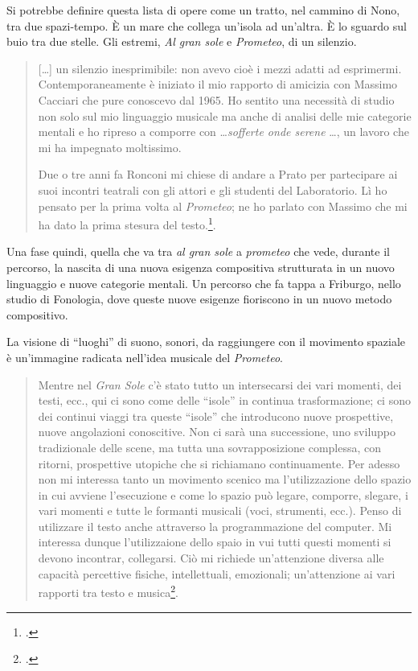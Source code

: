 Si potrebbe definire questa lista di opere come un tratto, nel cammino di Nono, tra due spazi-tempo. È un mare che collega un'isola ad un'altra. È lo sguardo sul buio tra due stelle. Gli estremi, \emph{Al gran sole} e \emph{Prometeo}, di un silenzio.

\begin{quote}
[\ldots] un silenzio inesprimibile: non avevo cioè i mezzi adatti ad esprimermi. Contemporaneamente è iniziato il mio rapporto di amicizia con Massimo Cacciari che pure conoscevo dal 1965. Ho sentito una necessità di studio non solo sul mio linguaggio musicale ma anche di analisi delle mie categorie mentali e ho ripreso a comporre con \ldots \emph{sofferte onde serene} \ldots, un lavoro che mi ha impegnato moltissimo.

	Due o tre anni fa Ronconi mi chiese di andare a Prato per partecipare ai suoi incontri teatrali con gli attori e gli studenti del Laboratorio. Lì ho pensato per la prima volta al \emph{Prometeo}; ne ho parlato con Massimo che mi ha dato la prima stesura del testo.\footcite[vol. II p. 245, \emph{Intervista di Renato Garavaglia 1979-80}]{nono:scrcol}.
\end{quote}

Una fase quindi, quella che va tra \emph{al gran sole} a \emph{prometeo} che vede, durante il percorso, la nascita di una nuova esigenza compositiva strutturata in un nuovo linguaggio e nuove categorie mentali. Un percorso che fa tappa a Friburgo, nello studio di Fonologia, dove queste nuove esigenze fioriscono in un nuovo metodo compositivo.

La visione di “luoghi” di suono, sonori, da raggiungere con il movimento spaziale è un'immagine radicata nell'idea musicale del \emph{Prometeo}.

\begin{quote}
	Mentre nel \emph{Gran Sole} c'è stato tutto un intersecarsi dei vari momenti, dei testi, ecc., qui ci sono come delle “isole” in continua trasformazione; ci sono dei continui viaggi tra queste “isole” che introducono nuove prospettive, nuove angolazioni conoscitive. Non ci sarà una successione, uno sviluppo tradizionale delle scene, ma tutta una sovrapposizione complessa, con ritorni, prospettive utopiche che si richiamano continuamente. Per adesso non mi interessa tanto un movimento scenico ma l'utilizzazione dello spazio in cui avviene l'esecuzione e come lo spazio può legare, comporre, slegare, i vari momenti e tutte le formanti musicali (voci, strumenti, ecc.). Penso di utilizzare il testo anche attraverso la programmazione del computer. Mi interessa dunque l'utilizzaione dello spaio in vui tutti questi momenti si devono incontrar, collegarsi. Ciò mi richiede un'attenzione diversa alle capacità percettive fisiche, intellettuali, emozionali; un'attenzione ai vari rapporti tra testo e musica\footcite[vol. II p. 245, \emph{Intervista di Renato Garavaglia} 1979-80]{nono:scrcol}.
\end{quote}


